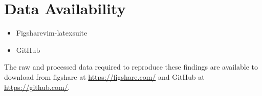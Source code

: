 \section{Data Availability}

\begin{itemize}
    \item Figsharevim-latexsuite
    \item GitHub
\end{itemize}

\par
The raw and processed data required to reproduce these findings are available to download from figshare at \url{https://figshare.com/} and GitHub at \url{https://github.com/}.